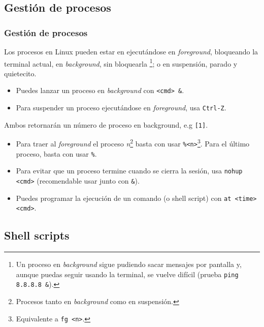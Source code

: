 \documentclass[aspectratio=43]{beamer}
\begin{document}
\subsection{Gestión de procesos}

\begin{frame}
    \frametitle{Gestión de procesos}
    
    Los procesos en Linux pueden estar en ejecutándose en \textit{foreground}, bloqueando la terminal actual, en \textit{background}, sin bloquearla \footnote{Un proceso en \textit{background} sigue pudiendo sacar mensajes por pantalla y, aunque puedas seguir usando la terminal, se vuelve difícil (prueba \texttt{ping 8.8.8.8 \&}).}; o en suspensión, parado y quietecito.

    \begin{itemize}
        \item Puedes lanzar un proceso en \textit{background} con \texttt{<cmd> \&}. 
        \item Para suspender un proceso ejecutándose en \textit{foreground}, usa \texttt{Ctrl-Z}.
    \end{itemize}
    
    Ambos retornarán un número de proceso en background, e.g \texttt{[1]}.
    
    \begin{itemize}
        \item Para traer al \textit{foreground} el proceso \textit{n}\footnote{Procesos tanto en \textit{background} como en suspensión.} basta con usar \texttt{\%<n>}\footnote{Equivalente a \texttt{fg <n>}.}. Para el último proceso, basta con usar \texttt{\%}.
        \item Para evitar que un proceso termine cuando se cierra la sesión, usa \texttt{nohup <cmd>} (recomendable usar junto con \texttt{\&}).
        \item Puedes programar la ejecución de un comando (o shell script) con \texttt{at <time> <cmd>}.
    \end{itemize}

\end{frame}


\subsection{Shell scripts}
\end{document}
